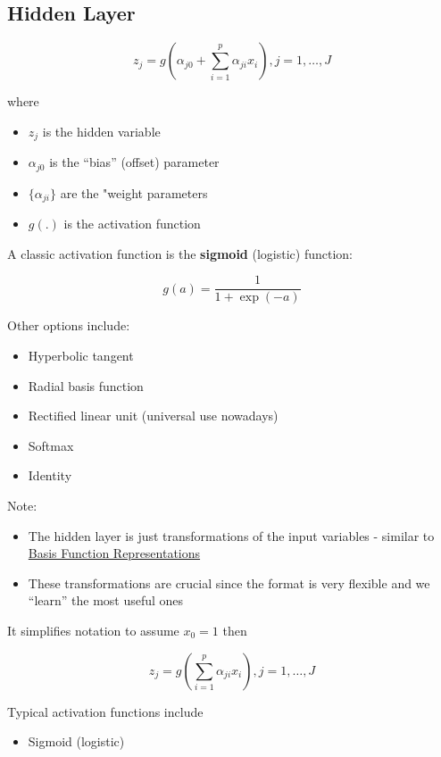 \documentclass[
]{book}
\providecommand{\tightlist}{%
  \setlength{\itemsep}{0pt}\setlength{\parskip}{0pt}}
\begin{document}
\hypertarget{hidden-layer}{%
\subsection{Hidden Layer}\label{hidden-layer}}

\[
z_j = g( \alpha_{j0} + \sum_{i = 1}^p \alpha_{ji} x_i), j = 1, \dots, J
\]

where

\begin{itemize}
\item
  \(z_j\) is the hidden variable
\item
  \(\alpha_{j0}\) is the ``bias'' (offset) parameter
\item
  \(\{\alpha_{ji}\}\) are the "weight parameters
\item
  \(g(.)\) is the activation function
\end{itemize}

A classic activation function is the \textbf{sigmoid} (logistic) function:

\[
g(a) = \frac{1}{1 + \exp(-a)}
\]

Other options include:

\begin{itemize}
\item
  Hyperbolic tangent
\item
  Radial basis function
\item
  Rectified linear unit (universal use nowadays)
\item
  Softmax
\item
  Identity
\end{itemize}

Note:

\begin{itemize}
\item
  The hidden layer is just transformations of the input variables - similar to \protect\hyperlink{basis-function-representations}{Basis Function Representations}
\item
  These transformations are crucial since the format is very flexible and we ``learn'' the most useful ones
\end{itemize}

It simplifies notation to assume \(x_0 = 1\) then

\[
z_j = g(\sum_{i=1}^p \alpha_{ji}x_i), j = 1, \dots, J
\]

Typical activation functions include

\begin{itemize}
\tightlist
\item
  Sigmoid (logistic)
\end{itemize}
\end{document}
